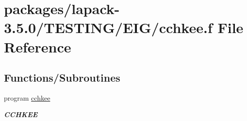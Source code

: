 \hypertarget{cchkee_8f}{}\section{packages/lapack-\/3.5.0/\+T\+E\+S\+T\+I\+N\+G/\+E\+I\+G/cchkee.f File Reference}
\label{cchkee_8f}
\subsection*{Functions/\+Subroutines}
\begin{DoxyCompactItemize}
\item 
program \hyperlink{group__complex__eig_ga53604133fb9ee893edcbd41d3863c2b4}{cchkee}
\begin{DoxyCompactList}\small\item\em {\bfseries C\+C\+H\+K\+E\+E} \end{DoxyCompactList}\end{DoxyCompactItemize}
